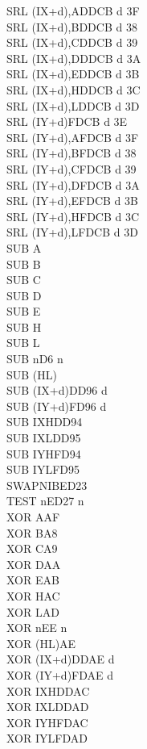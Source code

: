 \documentclass[12pt,twoside,openright,a4paper]{book}
\begin{document}
\begin{multicols}{3}
{\begin{tabbing}
		SRL (IX+d),A\UNDOC\>DDCB d 3F\\
		SRL (IX+d),B\UNDOC\>DDCB d 38\\
		SRL (IX+d),C\UNDOC\>DDCB d 39\\
		SRL (IX+d),D\UNDOC\>DDCB d 3A\\
		SRL (IX+d),E\UNDOC\>DDCB d 3B\\
		SRL (IX+d),H\UNDOC\>DDCB d 3C\\
		SRL (IX+d),L\UNDOC\>DDCB d 3D\\
		SRL (IY+d)\>FDCB d 3E\\
		SRL (IY+d),A\UNDOC\>FDCB d 3F\\
		SRL (IY+d),B\UNDOC\>FDCB d 38\\
		SRL (IY+d),C\UNDOC\>FDCB d 39\\
		SRL (IY+d),D\UNDOC\>FDCB d 3A\\
		SRL (IY+d),E\UNDOC\>FDCB d 3B\\
		SRL (IY+d),H\UNDOC\>FDCB d 3C\\
		SRL (IY+d),L\UNDOC\>FDCB d 3D\\
		SUB A\\
		SUB B\\
		SUB C\\
		SUB D\\
		SUB E\\
		SUB H\\
		SUB L\\
		SUB n\>D6 n\\
		SUB (HL)\\
		SUB (IX+d)\>DD96 d\\
		SUB (IY+d)\>FD96 d\\
		SUB IXH\UNDOC\>DD94\\
		SUB IXL\UNDOC\>DD95\\
		SUB IYH\UNDOC\>FD94\\
		SUB IYL\UNDOC\>FD95\\
		SWAPNIB\ZXN\>ED23\\
		TEST n\ZXN\>ED27 n\\
		XOR A\>AF\\
		XOR B\>A8\\
		XOR C\>A9\\
		XOR D\>AA\\
		XOR E\>AB\\
		XOR H\>AC\\
		XOR L\>AD\\
		XOR n\>EE n\\
		XOR (HL)\>AE\\
		XOR (IX+d)\>DDAE d\\
		XOR (IY+d)\>FDAE d\\
		XOR IXH\UNDOC\>DDAC\\
		XOR IXL\UNDOC\>DDAD\\
		XOR IYH\UNDOC\>FDAC\\
		XOR IYL\UNDOC\>FDAD

	\end{tabbing}
}
\end{multicols}
\normalsize
\end{document}
